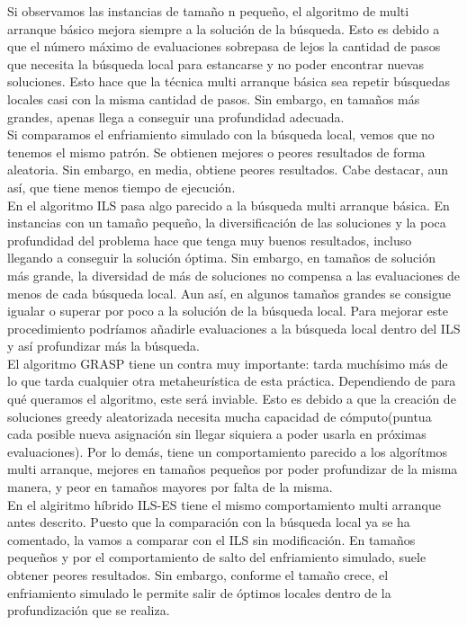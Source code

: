 Si observamos las instancias de tamaño n pequeño, el algoritmo de multi arranque básico mejora siempre a la solución de la búsqueda. Esto es debido a que el número máximo de evaluaciones sobrepasa de lejos la cantidad de pasos que necesita la búsqueda local para estancarse y no poder encontrar nuevas soluciones. Esto hace que la técnica multi arranque básica sea repetir búsquedas locales casi con la misma cantidad de pasos. Sin embargo, en tamaños más grandes, apenas llega a conseguir una profundidad adecuada. \\

Si comparamos el enfriamiento simulado con la búsqueda local, vemos que no tenemos el mismo patrón. Se obtienen mejores o peores resultados de forma aleatoria. Sin embargo, en media, obtiene peores resultados. Cabe destacar, aun así, que tiene menos tiempo de ejecución.\\

En el algoritmo ILS pasa algo parecido a la búsqueda multi arranque básica. En instancias con un tamaño pequeño, la diversificación de las soluciones y la poca profundidad del problema hace que tenga muy buenos resultados, incluso llegando a  conseguir la solución óptima. Sin embargo, en tamaños de solución más grande, la diversidad de más de soluciones no compensa a las evaluaciones de menos de cada búsqueda local. Aun así, en algunos tamaños grandes se consigue igualar o superar por  poco a la solución de la búsqueda local. Para mejorar este procedimiento podríamos añadirle evaluaciones a la búsqueda local dentro del ILS y así profundizar más la búsqueda.\\

El algoritmo GRASP tiene un contra muy importante: tarda muchísimo más de lo que tarda cualquier otra metaheurística de esta práctica. Dependiendo de para qué queramos el algoritmo, este será inviable. Esto es debido a que la creación de soluciones greedy aleatorizada necesita mucha capacidad de cómputo(puntua cada posible nueva asignación sin llegar siquiera a poder usarla en próximas evaluaciones). Por lo demás, tiene un comportamiento parecido a los algorítmos multi arranque, mejores en tamaños pequeños por poder profundizar de la misma manera, y peor en tamaños mayores por falta de la misma. \\

En el algiritmo híbrido ILS-ES tiene el mismo comportamiento multi arranque antes descrito. Puesto que la comparación con la búsqueda local ya se ha comentado, la vamos a comparar con el ILS sin modificación. En tamaños pequeños y por el comportamiento de salto del enfriamiento simulado, suele obtener peores resultados. Sin embargo, conforme el tamaño crece, el enfriamiento simulado le permite salir de óptimos locales dentro de la profundización que se realiza.\\


